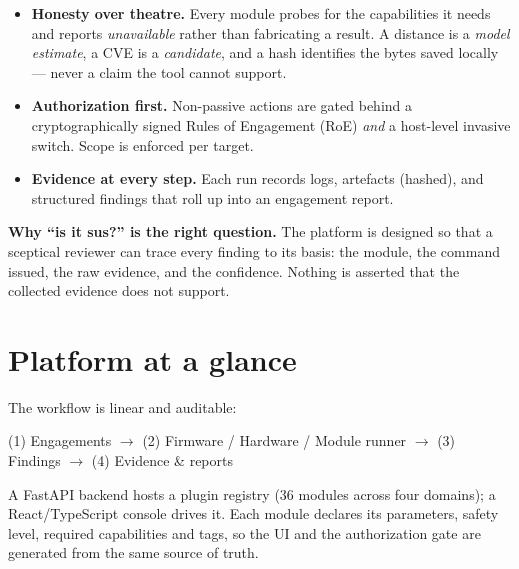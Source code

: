 \documentclass[11pt]{article}
\begin{document}
\begin{itemize}
  \item \textbf{Honesty over theatre.} Every module probes for the capabilities
  it needs and reports \emph{unavailable} rather than fabricating a result. A
  distance is a \emph{model estimate}, a CVE is a \emph{candidate}, and a hash
  identifies the bytes saved locally --- never a claim the tool cannot support.
  \item \textbf{Authorization first.} Non-passive actions are gated behind a
  cryptographically signed Rules of Engagement (RoE) \emph{and} a host-level
  invasive switch. Scope is enforced per target.
  \item \textbf{Evidence at every step.} Each run records logs, artefacts
  (hashed), and structured findings that roll up into an engagement report.
\end{itemize}

\begin{callout}
\textbf{Why ``is it sus?'' is the right question.} The platform is designed so
that a sceptical reviewer can trace every finding to its basis: the module, the
command issued, the raw evidence, and the confidence. Nothing is asserted that
the collected evidence does not support.
\end{callout}

\section{Platform at a glance}
The workflow is linear and auditable:
\begin{center}
\begin{codebox}\small\ttfamily (1) Engagements $\rightarrow$ (2) Firmware / Hardware / Module runner $\rightarrow$ (3) Findings $\rightarrow$ (4) Evidence \& reports\end{codebox}
\end{center}

A FastAPI backend hosts a plugin registry (36 modules across four domains); a
React/TypeScript console drives it. Each module declares its parameters,
safety level, required capabilities and tags, so the UI and the authorization
gate are generated from the same source of truth.
\end{document}
